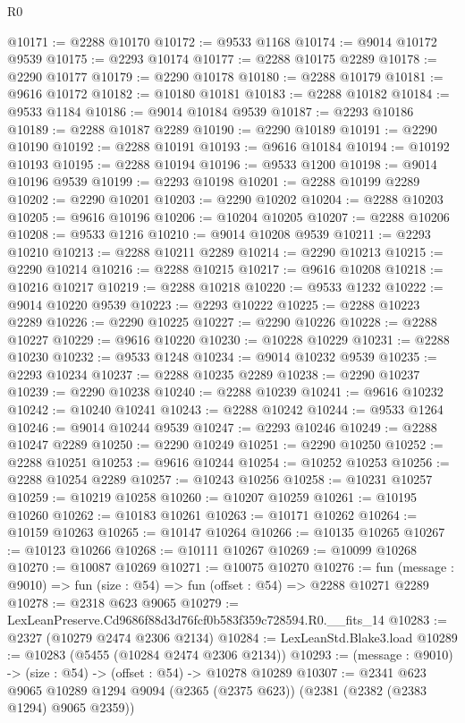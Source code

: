 \begin{lexlean}{R0}
\begin{coremodule}
@10171 := @2288 @10170
@10172 := @9533 @1168
@10174 := @9014 @10172 @9539
@10175 := @2293 @10174
@10177 := @2288 @10175 @2289
@10178 := @2290 @10177
@10179 := @2290 @10178
@10180 := @2288 @10179
@10181 := @9616 @10172
@10182 := @10180 @10181
@10183 := @2288 @10182
@10184 := @9533 @1184
@10186 := @9014 @10184 @9539
@10187 := @2293 @10186
@10189 := @2288 @10187 @2289
@10190 := @2290 @10189
@10191 := @2290 @10190
@10192 := @2288 @10191
@10193 := @9616 @10184
@10194 := @10192 @10193
@10195 := @2288 @10194
@10196 := @9533 @1200
@10198 := @9014 @10196 @9539
@10199 := @2293 @10198
@10201 := @2288 @10199 @2289
@10202 := @2290 @10201
@10203 := @2290 @10202
@10204 := @2288 @10203
@10205 := @9616 @10196
@10206 := @10204 @10205
@10207 := @2288 @10206
@10208 := @9533 @1216
@10210 := @9014 @10208 @9539
@10211 := @2293 @10210
@10213 := @2288 @10211 @2289
@10214 := @2290 @10213
@10215 := @2290 @10214
@10216 := @2288 @10215
@10217 := @9616 @10208
@10218 := @10216 @10217
@10219 := @2288 @10218
@10220 := @9533 @1232
@10222 := @9014 @10220 @9539
@10223 := @2293 @10222
@10225 := @2288 @10223 @2289
@10226 := @2290 @10225
@10227 := @2290 @10226
@10228 := @2288 @10227
@10229 := @9616 @10220
@10230 := @10228 @10229
@10231 := @2288 @10230
@10232 := @9533 @1248
@10234 := @9014 @10232 @9539
@10235 := @2293 @10234
@10237 := @2288 @10235 @2289
@10238 := @2290 @10237
@10239 := @2290 @10238
@10240 := @2288 @10239
@10241 := @9616 @10232
@10242 := @10240 @10241
@10243 := @2288 @10242
@10244 := @9533 @1264
@10246 := @9014 @10244 @9539
@10247 := @2293 @10246
@10249 := @2288 @10247 @2289
@10250 := @2290 @10249
@10251 := @2290 @10250
@10252 := @2288 @10251
@10253 := @9616 @10244
@10254 := @10252 @10253
@10256 := @2288 @10254 @2289
@10257 := @10243 @10256
@10258 := @10231 @10257
@10259 := @10219 @10258
@10260 := @10207 @10259
@10261 := @10195 @10260
@10262 := @10183 @10261
@10263 := @10171 @10262
@10264 := @10159 @10263
@10265 := @10147 @10264
@10266 := @10135 @10265
@10267 := @10123 @10266
@10268 := @10111 @10267
@10269 := @10099 @10268
@10270 := @10087 @10269
@10271 := @10075 @10270
@10276 := fun (message : @9010) => fun (size : @54) => fun (offset : @54) => @2288 @10271 @2289
@10278 := @2318 @623 @9065
@10279 := LexLeanPreserve.Cd9686f88d3d76fcf0b583f359c728594.R0.__fits_14
@10283 := @2327 (@10279 @2474 @2306 @2134)
@10284 := LexLeanStd.Blake3.load
@10289 := @10283 (@5455 (@10284 @2474 @2306 @2134))
@10293 := (message : @9010) -> (size : @54) -> (offset : @54) -> @10278 @10289
@10307 := @2341
    @623
    @9065
    @10289
    @1294
    @9094
    (@2365 (@2375 @623))
    (@2381 (@2382 (@2383 @1294) @9065 @2359))

\end{coremodule}
\end{lexlean}
